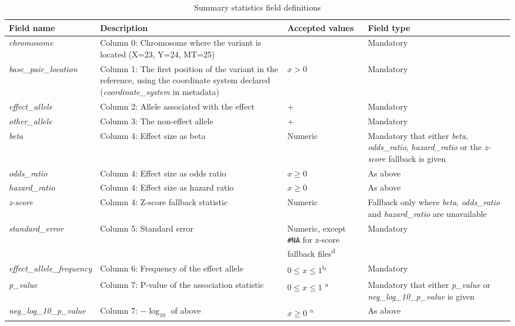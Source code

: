 \documentclass[11pt]{article}
\newenvironment{threeparttable}{}{}
\newcommand{\tnote}[1]{\textsuperscript{#1}}
\begin{document}
\begin{landscape}
\begin{table}[h]
 \begin{threeparttable}
  \caption{Summary statistics field definitions}
  \centering
  \scriptsize
  \begin{tabularx}{\linewidth} { 
    | >{\hsize=0.7\hsize\centering\arraybackslash}X 
    | >{\hsize=1\hsize\centering\arraybackslash}X 
    | >{\hsize=1.5\hsize\centering\arraybackslash}X 
    | >{\hsize=0.8\hsize\centering\arraybackslash}X | } 
   \hline
   Field name & Description & Accepted values & Field type \\
   \hline
   \textit{chromosome} & Column 0: Chromosome where the variant is located (X=23, Y=24, MT=25) & [1-25] & Mandatory\\
   \textit{base\_pair\_location} & Column 1: The first position of the variant in the reference, using the coordinate system declared (\textit{coordinate\_system} in metadata)  & $x > 0$ & Mandatory\\
   \textit{effect\_allele} & Column 2: Allele associated with the effect & [ACGT]+ & Mandatory\\
   \textit{other\_allele} & Column 3: The non-effect allele & [ACGT]+ & Mandatory\\
   \textit{beta} & Column 4: Effect size as beta & Numeric & Mandatory that either \textit{beta}, \textit{odds\_ratio}, \textit{hazard\_ratio} or the \textit{z-score} fallback is given\\
   \textit{odds\_ratio} & Column 4: Effect size as odds ratio & $x \ge 0$ & As above\\
   \textit{hazard\_ratio} & Column 4: Effect size as hazard ratio & $x \ge 0$ & As above\\
   \textit{z-score} & Column 4: Z-score fallback statistic & Numeric & Fallback only where \textit{beta}, \textit{odds\_ratio} and \textit{hazard\_ratio} are unavailable\\
   \textit{standard\_error} & Column 5: Standard error & Numeric, except \texttt{\#NA} for z-score fallback files\tnote{d} & Mandatory\\
   \textit{effect\_allele\_frequency} & Column 6: Frequency of the effect allele & $0 \le x \le 1$\tnote{b} & Mandatory\\
   \textit{p\_value} & Column 7: P-value of the association statistic & $0 \le x \le 1$ \tnote{a} & Mandatory that either \textit{p\_value} or \textit{neg\_log\_10\_p\_value} is given\\
   \textit{neg\_log\_10\_p\_value} & Column 7: $-\log_{10}$ of above& $x \ge 0$ \tnote{a} & As above \\

\end{tabularx}
\end{threeparttable}
\end{table}
\end{landscape}
\end{document}
